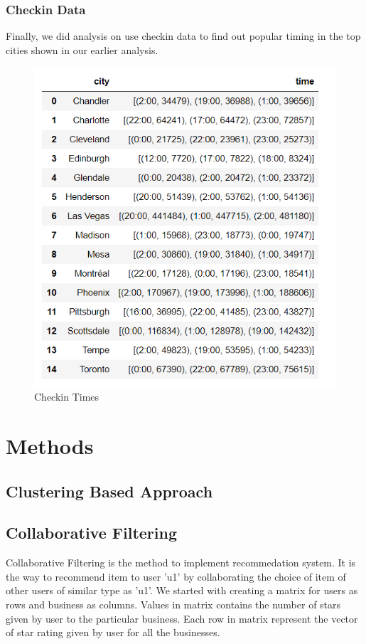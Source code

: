 \documentclass[11pt]{article}
\begin{document}
 	\subsubsection{Checkin Data}
 	Finally, we did analysis on use checkin data to find out popular timing in the top cities shown in our earlier analysis.
 
      \begin{figure}[h]
 		\centering
 		\includegraphics[scale=0.5] {checkin_times.png}
 		\caption{Checkin Times}
 	\end{figure}
 	
	\section{Methods}
		
		\subsection{Clustering Based Approach}
		
		\subsection{Collaborative Filtering}
		Collaborative Filtering is the method to implement recommedation system. It is the way to recommend item to user 'u1' by collaborating the choice of item of other users of similar type as 'u1'. We started with creating a matrix for users as rows and business as columns. Values in matrix contains the number of stars given by user to the particular business. Each row in matrix represent the vector of star rating given by user for all the businesses. \\
	 
\end{document}
